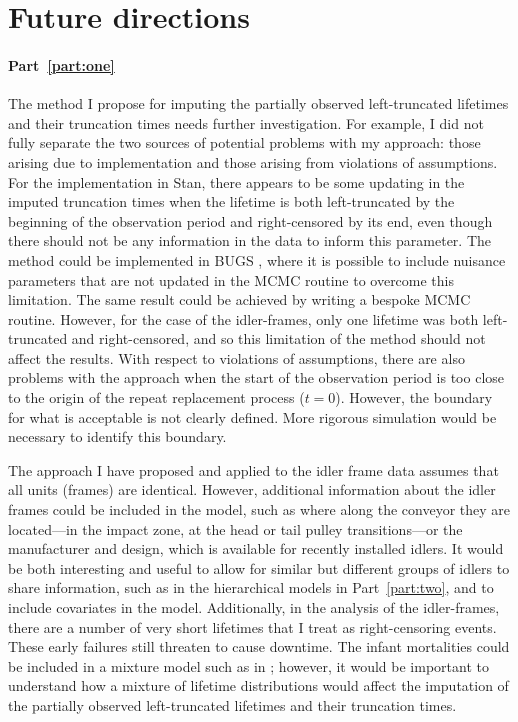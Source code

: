 \section{Future directions} \label{sec:thesis-future-work}

\paragraph*{Part~\ref{part:one}} The method I propose for imputing the partially observed left-truncated lifetimes and their truncation times needs further investigation. For example, I did not fully separate the two sources of potential problems with my approach: those arising due to implementation and those arising from violations of assumptions. For the implementation in Stan, there appears to be some updating in the imputed truncation times when the lifetime is both left-truncated by the beginning of the observation period and right-censored by its end, even though there should not be any information in the data to inform this parameter. The method could be implemented in BUGS \citep{lunn2012}, where it is possible to include nuisance parameters that are not updated in the MCMC routine to overcome this limitation. The same result could be achieved by writing a bespoke MCMC routine. However, for the case of the idler-frames, only one lifetime was both left-truncated and right-censored, and so this limitation of the method should not affect the results. With respect to violations of assumptions, there are also problems with the approach when the start of the observation period is too close to the origin of the repeat replacement process ($t = 0$). However, the boundary for what is acceptable is not clearly defined. More rigorous simulation would be necessary to identify this boundary.

The approach I have proposed and applied to the idler frame data assumes that all units (frames) are identical. However, additional information about the idler frames could be included in the model, such as where along the conveyor they are located---in the impact zone, at the head or tail pulley transitions---or the manufacturer and design, which is available for recently installed idlers. It would be both interesting and useful to allow for similar but different groups of idlers to share information, such as in the hierarchical models in Part~\ref{part:two}, and to include covariates in the model. Additionally, in the analysis of the idler-frames, there are a number of very short lifetimes that I treat as right-censoring events. These early failures still threaten to cause downtime. The infant mortalities could be included in a mixture model such as in \citet{mittman2013}; however, it would be important to understand how a mixture of lifetime distributions would affect the imputation of the partially observed left-truncated lifetimes and their truncation times.

